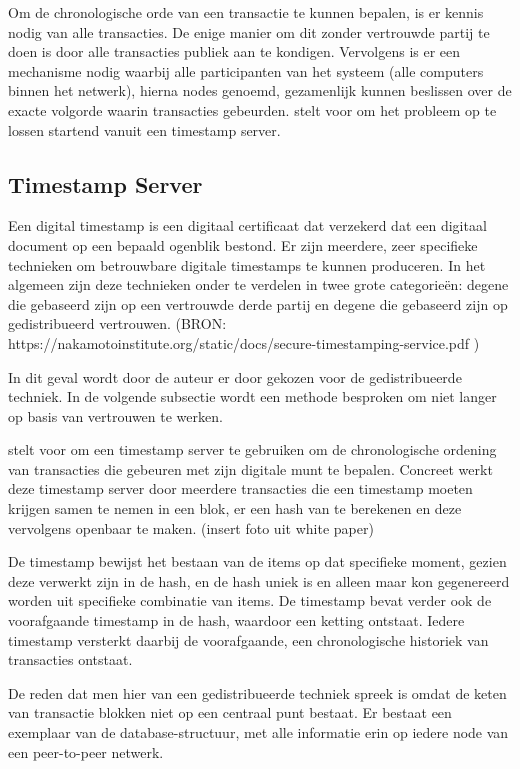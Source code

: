	Om de chronologische orde van een transactie te kunnen bepalen, is er kennis nodig van alle transacties. De enige manier om dit zonder vertrouwde partij te doen is door alle transacties publiek aan te kondigen. Vervolgens is er een mechanisme nodig waarbij alle participanten van het systeem (alle computers binnen het netwerk), hierna nodes genoemd, gezamenlijk kunnen beslissen over de exacte volgorde waarin transacties gebeurden. \textcite{Nakamoto2008} stelt voor om het probleem op te lossen startend vanuit een timestamp server. 
			
	\subsection{Timestamp Server}
	Een digital timestamp is een digitaal certificaat dat verzekerd dat een digitaal document op een bepaald ogenblik bestond. Er zijn meerdere, zeer specifieke technieken om betrouwbare digitale timestamps te kunnen produceren. In het algemeen zijn deze technieken onder te verdelen in twee grote categorieën: degene die gebaseerd zijn op een vertrouwde derde partij en degene die gebaseerd zijn op gedistribueerd vertrouwen. (BRON: https://nakamotoinstitute.org/static/docs/secure-timestamping-service.pdf )
	
	In dit geval wordt door de auteur er door \textcite{Nakamoto2008} gekozen voor de gedistribueerde techniek. In de volgende subsectie wordt een methode besproken om niet langer op basis van vertrouwen te werken.
	
	\textcite{Nakamoto2008} stelt voor om een timestamp server te gebruiken om de chronologische ordening van transacties die gebeuren met zijn digitale munt te bepalen.  Concreet werkt deze timestamp server door meerdere transacties die een timestamp moeten krijgen samen te nemen in een blok, er een hash van te berekenen en deze vervolgens openbaar te maken. (insert foto uit white paper)
	
	De timestamp bewijst het bestaan van de items op dat specifieke moment, gezien deze verwerkt zijn in de hash, en de hash uniek is en alleen maar kon gegenereerd worden uit specifieke combinatie van items. De timestamp bevat verder ook de voorafgaande timestamp in de hash, waardoor een ketting ontstaat. Iedere timestamp versterkt daarbij de voorafgaande, een chronologische historiek van transacties ontstaat.
	
	De reden dat men hier van een gedistribueerde techniek spreek is omdat de keten van transactie blokken niet op een centraal punt bestaat. Er bestaat een exemplaar van de database-structuur, met alle informatie erin op iedere node van een peer-to-peer netwerk. 
	
